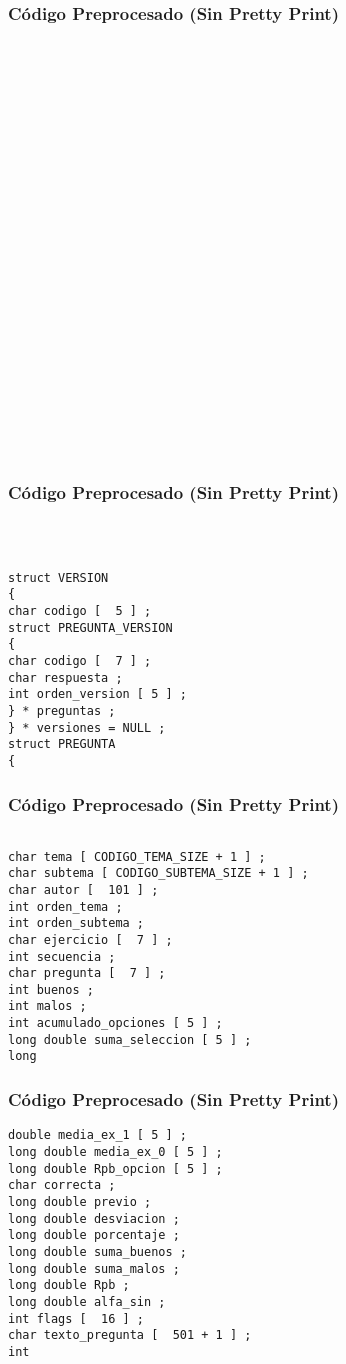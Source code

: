 \documentclass{beamer}
\begin{document}
\begin{frame}[fragile]
\frametitle{C\'odigo Preprocesado (Sin Pretty Print)}
\begin{lstlisting}[style=CStyle]


 

 

 

 

 

 

 

 

 

 

 

 

 \end{lstlisting}
\end{frame}
\begin{frame}[fragile]
\frametitle{C\'odigo Preprocesado (Sin Pretty Print)}
\begin{lstlisting}[style=CStyle]


 
struct VERSION 
{ 
char codigo [  5 ] ; 
struct PREGUNTA_VERSION 
{ 
char codigo [  7 ] ; 
char respuesta ; 
int orden_version [ 5 ] ; 
} * preguntas ; 
} * versiones = NULL ; 
struct PREGUNTA 
{ \end{lstlisting}
\end{frame}
\begin{frame}[fragile]
\frametitle{C\'odigo Preprocesado (Sin Pretty Print)}
\begin{lstlisting}[style=CStyle]

char tema [ CODIGO_TEMA_SIZE + 1 ] ; 
char subtema [ CODIGO_SUBTEMA_SIZE + 1 ] ; 
char autor [  101 ] ; 
int orden_tema ; 
int orden_subtema ; 
char ejercicio [  7 ] ; 
int secuencia ; 
char pregunta [  7 ] ; 
int buenos ; 
int malos ; 
int acumulado_opciones [ 5 ] ; 
long double suma_seleccion [ 5 ] ; 
long \end{lstlisting}
\end{frame}
\begin{frame}[fragile]
\frametitle{C\'odigo Preprocesado (Sin Pretty Print)}
\begin{lstlisting}[style=CStyle]
double media_ex_1 [ 5 ] ; 
long double media_ex_0 [ 5 ] ; 
long double Rpb_opcion [ 5 ] ; 
char correcta ; 
long double previo ; 
long double desviacion ; 
long double porcentaje ; 
long double suma_buenos ; 
long double suma_malos ; 
long double Rpb ; 
long double alfa_sin ; 
int flags [  16 ] ; 
char texto_pregunta [  501 + 1 ] ; 
int \end{lstlisting}
\end{frame}
\end{document}
